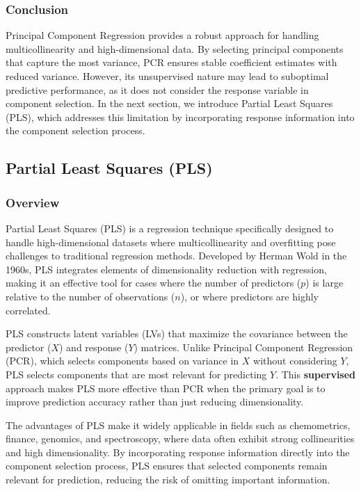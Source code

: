 \documentclass[11pt,twoside,a4paper]{article}
\begin{document}
\subsubsection{Conclusion}
Principal Component Regression provides a robust approach for handling multicollinearity and high-dimensional data. By selecting principal components that capture the most variance, PCR ensures stable coefficient estimates with reduced variance. However, its unsupervised nature may lead to suboptimal predictive performance, as it does not consider the response variable in component selection. In the next section, we introduce Partial Least Squares (PLS), which addresses this limitation by incorporating response information into the component selection process.

\subsection{Partial Least Squares (PLS)}

\subsubsection{Overview}
Partial Least Squares (PLS) is a regression technique specifically designed to handle high-dimensional datasets where multicollinearity and overfitting pose challenges to traditional regression methods. Developed by Herman Wold in the 1960s, PLS integrates elements of dimensionality reduction with regression, making it an effective tool for cases where the number of predictors (\( p \)) is large relative to the number of observations (\( n \)), or where predictors are highly correlated.

PLS constructs latent variables (LVs) that maximize the covariance between the predictor (\(X\)) and response (\(Y\)) matrices. Unlike Principal Component Regression (PCR), which selects components based on variance in \( X \) without considering \( Y \), PLS selects components that are most relevant for predicting \( Y \). This \textbf{supervised} approach makes PLS more effective than PCR when the primary goal is to improve prediction accuracy rather than just reducing dimensionality.

The advantages of PLS make it widely applicable in fields such as chemometrics, finance, genomics, and spectroscopy, where data often exhibit strong collinearities and high dimensionality. By incorporating response information directly into the component selection process, PLS ensures that selected components remain relevant for prediction, reducing the risk of omitting important information.
\end{document}
